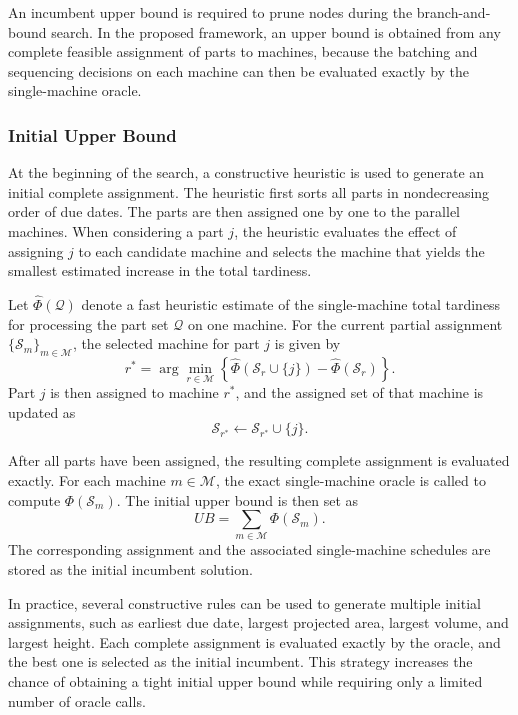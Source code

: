 \documentclass[review,3p,times,authoryear]{elsarticle}
\begin{document}
An incumbent upper bound is required to prune nodes during the
branch-and-bound search. In the proposed framework, an upper bound is
obtained from any complete feasible assignment of parts to machines, because
the batching and sequencing decisions on each machine can then be evaluated
exactly by the single-machine oracle.

\subsubsection{Initial Upper Bound}

At the beginning of the search, a constructive heuristic is used to generate
an initial complete assignment. The heuristic first sorts all parts in
nondecreasing order of due dates. The parts are then assigned one by one to
the parallel machines. When considering a part $j$, the heuristic evaluates
the effect of assigning $j$ to each candidate machine and selects the
machine that yields the smallest estimated increase in the total tardiness.

Let $\widehat{\Phi}(\mathcal{Q})$ denote a fast heuristic estimate of the
single-machine total tardiness for processing the part set
$\mathcal{Q}$ on one machine. For the current partial assignment
$\{\mathcal{S}_m\}_{m\in\mathcal{M}}$, the selected machine for part $j$ is
given by
\[
r^*
=
\arg\min_{r\in\mathcal{M}}
\left\{
\widehat{\Phi}(\mathcal{S}_r\cup\{j\})
-
\widehat{\Phi}(\mathcal{S}_r)
\right\}.
\]
Part $j$ is then assigned to machine $r^*$, and the assigned set of that
machine is updated as
\[
\mathcal{S}_{r^*}\leftarrow \mathcal{S}_{r^*}\cup\{j\}.
\]

After all parts have been assigned, the resulting complete assignment is
evaluated exactly. For each machine $m\in\mathcal{M}$, the exact
single-machine oracle is called to compute
$\Phi(\mathcal{S}_m)$. The initial upper bound is then set as
\[
UB
=
\sum_{m\in\mathcal{M}}
\Phi(\mathcal{S}_m).
\]
The corresponding assignment and the associated single-machine schedules
are stored as the initial incumbent solution.

In practice, several constructive rules can be used to generate multiple
initial assignments, such as earliest due date, largest projected area,
largest volume, and largest height. Each complete assignment is evaluated
exactly by the oracle, and the best one is selected as the initial
incumbent. This strategy increases the chance of obtaining a tight initial
upper bound while requiring only a limited number of oracle calls.
\end{document}
